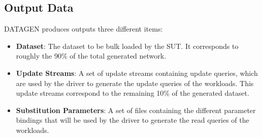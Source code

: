 %
%
%
%
%

\subsection{Output Data}

DATAGEN produces outputs three different items:
\begin{itemize}
  \item \textbf{Dataset}: The dataset to be bulk loaded by the SUT. It
    corresponds to roughly the 90\% of the total generated network.
  \item \textbf{Update Streams}: A set of update streams containing update
    queries, which are used by the driver to generate the update queries of the
    workloads. This update
    streams correspond to the remaining 10\% of the generated dataset.
  \item \textbf{Substitution Parameters}: A set of files containing the
    different parameter bindings that will be used by the driver to generate the
    read queries of the workloads.
\end{itemize}

